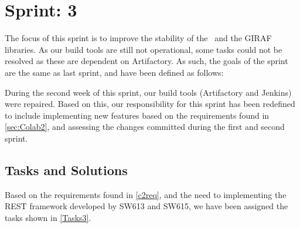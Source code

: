 \chapter{Sprint: 3}
The focus of this sprint is to improve the stability of the \lapp\ and the GIRAF
libraries. As our build tools are still not operational, some tasks could not
be resolved as these are dependent on Artifactory. As such, the goals of the
sprint are the same as last sprint, and have been defined as follows:\nl

\nl

\nl 

\nl

During the second week of this sprint, our build tools (Artifactory and Jenkins)
were repaired. Based on this, our responsibility for this sprint has been
redefined to include implementing new features based on the requirements found
in \autoref{sec:Colab2}, and assessing the changes committed during the first
and second sprint. 
 
\section{Tasks and Solutions}
Based on the requirements found in \autoref{c2req}, and the need to
implementing the REST framework developed by SW613 and SW615, we have been
assigned the tasks shown in \autoref{Tasks3}. 


